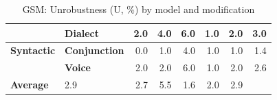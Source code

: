 \begin{table}[h]
{\begin{tabular}{llrrrrrr}
  & \textbf{Dialect} & \cellcolor{blue!5} 2.0 & \cellcolor{blue!10} 4.0 & \cellcolor{blue!15} 6.0 & \cellcolor{blue!3} 1.0 & \cellcolor{blue!5} 2.0 & \cellcolor{blue!8} 3.0 \\
\midrule
\textbf{Syntactic} & \textbf{Conjunction} & \cellcolor{blue!0} 0.0 & \cellcolor{blue!3} 1.0 & \cellcolor{blue!10} 4.0 & \cellcolor{blue!3} 1.0 & \cellcolor{blue!3} 1.0 & \cellcolor{blue!4} 1.4 \\
  & \textbf{Voice} & \cellcolor{blue!5} 2.0 & \cellcolor{blue!5} 2.0 & \cellcolor{blue!15} 6.0 & \cellcolor{blue!3} 1.0 & \cellcolor{blue!5} 2.0 & \cellcolor{blue!7} 2.6 \\
\midrule
\textbf{Average} &  \cellcolor{blue!8} 2.9 & \cellcolor{blue!7} 2.7 & \cellcolor{blue!14} 5.5 & \cellcolor{blue!4} 1.6 & \cellcolor{blue!5} 2.0 & \cellcolor{blue!8} 2.9 \\
\bottomrule
\end{tabular}}
\caption{GSM: Unrobustness (U, \%) by model and modification}\label{tab:gsm_unrob}
\end{table}